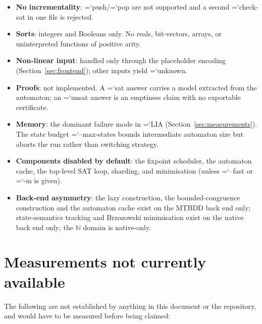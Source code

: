 \documentclass[10pt,a4paper]{article}
\newcommand{\code}[1]{{\small\ttfamily\hyphenchar\font=`\-\relax #1}}
\newcommand{\Nat}{\mathbb{N}}
\begin{document}
\begin{itemize}
  \item \textbf{No incrementality}: \code{push}/\code{pop} are not supported and a second
        \code{check-sat} in one file is rejected.
  \item \textbf{Sorts}: integers and Booleans only.  No reals, bit-vectors, arrays, or uninterpreted
        functions of positive arity.
  \item \textbf{Non-linear input}: handled only through the placeholder encoding
        (Section~\ref{sec:frontend}); other inputs yield \code{unknown}.
  \item \textbf{Proofs}: not implemented.  A \code{sat} answer carries a model extracted from the
        automaton; an \code{unsat} answer is an emptiness claim with no exportable certificate.
  \item \textbf{Memory}: the dominant failure mode in \code{LIA} (Section~\ref{sec:measurements}).  The
        state budget \code{--max-states} bounds intermediate automaton size but aborts the run rather
        than switching strategy.
  \item \textbf{Components disabled by default}: the fixpoint scheduler, the automaton cache, the
        top-level SAT loop, sharding, and minimisation (unless \code{--fast} or \code{-m} is given).
  \item \textbf{Back-end asymmetry}: the lazy construction, the bounded-congruence construction and the
        automaton cache exist on the MTBDD back end only; state-semantics tracking and Brzozowski
        minimisation exist on the native back end only; the $\Nat$ domain is native-only.
\end{itemize}

\section{Measurements not currently available}
\label{sec:notmeasured}

The following are not established by anything in this document or the repository, and would have to be
measured before being claimed:
\end{document}
